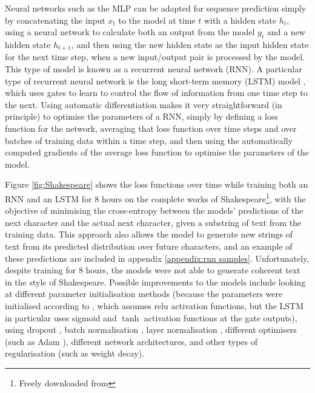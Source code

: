 Neural networks such as the MLP can be adapted for sequence prediction simply by concatenating the input $x_t$ to the model at time $t$ with a hidden state $h_t$, using a neural network to calculate both an output from the model $y_t$ and a new hidden state $h_{t+1}$, and then using the new hidden state as the input hidden state for the next time step, when a new input/output pair is processed by the model. This type of model is known as a recurrent neural network (RNN). A particular type of recurrent neural network is the long short-term memory (LSTM) model \cite{hochreiter1997long}, which uses gates to learn to control the flow of information from one time step to the next. Using automatic differentiation makes it very straightforward (in principle) to optimise the parameters of a RNN, simply by defining a loss function for the network, averaging that loss function over time steps and over batches of training data within a time step, and then using the automatically computed gradients of the average loss function to optimise the parameters of the model.

Figure \ref{fig:Shakespeare} shows the loss functions over time while training both an RNN and an LSTM for 8 hours on the complete works of Shakespeare\footnote{Freely downloaded from }, with the objective of minimising the cross-entropy between the models' predictions of the next character and the actual next character, given a substring of text from the training data. This approach also allows the model to generate new strings of text from its predicted distribution over future characters, and an example of these predictions are included in appendix \ref{appendix:rnn samples}. Unfortunately, despite training for 8 hours, the models were not able to generate coherent text in the style of Shakespeare. Possible improvements to the models include looking at different parameter initialisation methods (because the parameters were initialised according to \cite{he2015delving}, which assumes relu activation functions, but the LSTM in particular uses sigmoid and $\tanh$ activation functions at the gate outputs), using dropout \cite{srivastava2014dropout} \cite{gal2016theoretically}, batch normalisation \cite{ioffe2015batch}, layer normalisation \cite{ba2016layer}, different optimisers (such as Adam \cite{kingma2014adam}), different network architectures, and other types of regularisation (such as weight decay).

